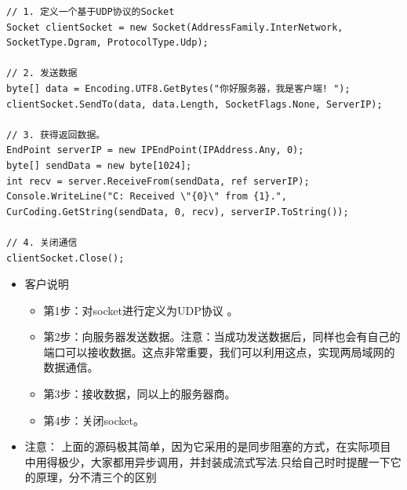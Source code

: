 \documentclass[9pt, b5paper]{article}
\begin{document}
\begin{verbatim}
// 1. 定义一个基于UDP协议的Socket
Socket clientSocket = new Socket(AddressFamily.InterNetwork, SocketType.Dgram, ProtocolType.Udp);

// 2. 发送数据
byte[] data = Encoding.UTF8.GetBytes("你好服务器，我是客户端! ");
clientSocket.SendTo(data, data.Length, SocketFlags.None, ServerIP);

// 3. 获得返回数据。
EndPoint serverIP = new IPEndPoint(IPAddress.Any, 0);
byte[] sendData = new byte[1024];
int recv = server.ReceiveFrom(sendData, ref serverIP);
Console.WriteLine("C: Received \"{0}\" from {1}.", CurCoding.GetString(sendData, 0, recv), serverIP.ToString());

// 4. 关闭通信
clientSocket.Close();
\end{verbatim}
\begin{itemize}
\item 客户说明
\begin{itemize}
\item 第1步：对socket进行定义为UDP协议 。
\item 第2步：向服务器发送数据。注意：当成功发送数据后，同样也会有自己的端口可以接收数据。这点非常重要，我们可以利用这点，实现两局域网的数据通信。
\item 第3步：接收数据，同以上的服务器商。
\item 第4步：关闭socket。
\end{itemize}
\item 注意： 上面的源码极其简单，因为它采用的是同步阻塞的方式，在实际项目中用得极少，大家都用异步调用，并封装成流式写法.只给自己时时提醒一下它的原理，分不清三个的区别
\end{itemize}
\end{document}
